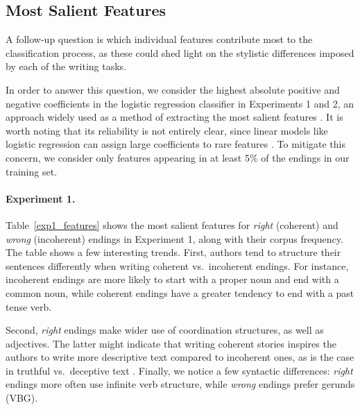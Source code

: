 \documentclass[11pt,a4paper]{article}
\newcommand{\tabref}[1]{Table~\ref{#1}}
\begin{document}
\subsection{Most Salient Features}
A follow-up question is which individual features contribute most to the classification process,
as these could shed light on the stylistic differences imposed by each of the writing tasks.

In order to answer this question, we consider the highest absolute
positive and negative coefficients in the logistic regression
classifier in Experiments 1 and 2, an approach widely used  as a
method of extracting the most salient features
\cite{Nguyen:2013,Burke:2013,Brooks:2013}. It is worth noting
  that its reliability is not entirely clear, since linear models like
  logistic regression can assign large coefficients to rare features \cite{Yano:2012}.
To mitigate this concern, we consider only features appearing in at least 5\% of the endings in our training set. 

\paragraph{Experiment 1.}
\tabref{exp1_features} shows the most salient features for {\it right} (coherent) and {\it wrong} (incoherent) endings in Experiment 1,
along with their corpus frequency. 
The table shows a few interesting trends. 
First, authors tend to structure their sentences differently when writing {coherent}  vs.~{incoherent} endings.
For instance, {incoherent} endings are more likely to start with a proper noun and end with a common noun, 
while coherent endings have a greater tendency to end with a past tense verb.

Second, {\it right} endings make wider use of coordination structures, as well as adjectives.
The latter might indicate that writing coherent stories inspires the authors to write more descriptive text compared to incoherent ones, 
as is the case in truthful vs.~deceptive text \cite{ott2011finding}.
Finally, we notice a few syntactic differences: {\it right} endings more often use infinite verb structure, while {\it wrong} endings prefer gerunds (VBG). 
\end{document}
